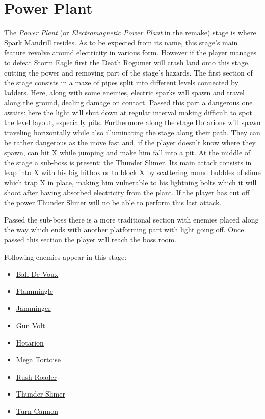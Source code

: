 \section{Power Plant}
The \textit{Power Plant} (or \textit{Electromagnetic Power Plant} in the remake) stage is where Spark Mandrill resides. As to be expected from its name, this stage's main feature revolve around electricity in various form. However if the player manages to defeat Storm Eagle first the Death Rogumer will crash land onto this stage, cutting the power and removing part of the stage's hazards. 
The first section of the stage consists in a maze of pipes split into different levels connected by ladders. Here, along with some enemies, electric sparks will spawn and travel along the ground, dealing damage on contact. Passed this part a dangerous one awaits: here the light will shut down at regular interval making difficult to spot the level layout, especially pits. Furthermore along the stage  \hyperlink{enem:Hotarion}{Hotarions} will spawn traveling horizontally while also illuminating the stage along their path. They can be rather dangerous as the move fast and, if the player doesn't know where they spawn, can hit X while jumping and make him fall into a pit.
At the middle of the stage a sub-boss is present: the \hyperlink{miniboss:Thunder_slimer}{Thunder Slimer}. Its main attack consists in leap into X with his big hitbox or to block X by scattering round bubbles of slime which trap X in place, making him vulnerable to his lightning bolts which it will shoot after having absorbed electricity from the plant. If the player has cut off the power Thunder Slimer will no be able to perform this last attack.

Passed the sub-boss there is a more traditional section with enemies placed along the way which ends with another platforming part with light going off. Once passed this section the player will reach the boss room.

Following enemies appear in this stage\cite{wiki:Power_plant}:
\begin{itemize}
	\item \hyperlink{enem:Ball_De_Voux}{Ball De Voux}
	\item \hyperlink{enem:Flammingle}{Flammingle}
	\item \hyperlink{enem:Jamminger}{Jamminger}
	\item \hyperlink{enem:Gun_Volt}{Gun Volt}
	\item \hyperlink{enem:Hotarion}{Hotarion}
	\item \hyperlink{enem:Mega_Tortoise}{Mega Tortoise}
	\item \hyperlink{enem:Rush_Roader}{Rush Roader}
	\item \hyperlink{miniboss:Thunder_Slimer}{Thunder Slimer}
	\item \hyperlink{enem:Turn_Cannon}{Turn Cannon}
\end{itemize}


